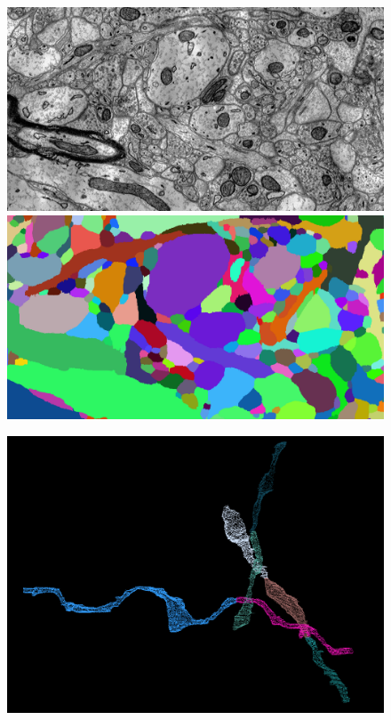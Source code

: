 \documentclass[10pt,twocolumn,letterpaper]{article}
\begin{document}
\begin{figure}[t]\footnotesize
	\vspace{-2.04in}
	\begin{minipage}{\textwidth}
		\begin{minipage}{0.125\textheight}
			\includegraphics[width=\linewidth]{figures/schema/teaser-image.png}
			\includegraphics[width=\linewidth]{figures/schema/teaser-segmentation.png}
		\end{minipage}
		\begin{minipage}{0.24\textwidth}
			\includegraphics[width=\linewidth]{figures/schema/pre-multicut.png}

\end{minipage}
\end{minipage}
\end{figure}
\end{document}

